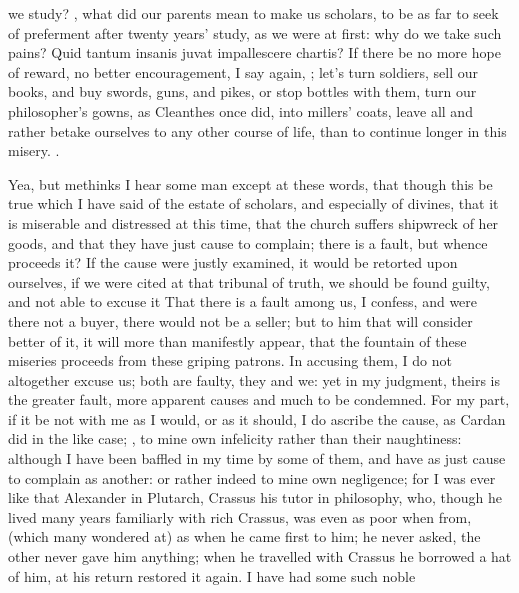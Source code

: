 {{we study? , what did
our parents mean to make us scholars, to be as far to seek of
preferment after twenty years' study, as we were at first: why do we
take such pains? Quid tantum insanis juvat impallescere chartis? If
there be no more hope of reward, no better encouragement, I say again,
; let's turn soldiers,
sell our books, and buy swords, guns, and pikes, or stop bottles with
them, turn our philosopher's gowns, as Cleanthes once did, into
millers' coats, leave all and rather betake ourselves to any other
course of life, than to continue longer in this misery. .

Yea, but methinks I hear some man except at these words, that though
this be true which I have said of the estate of scholars, and
especially of divines, that it is miserable and distressed at this
time, that the church suffers shipwreck of her goods, and that they
have just cause to complain; there is a fault, but whence proceeds it?
If the cause were justly examined, it would be retorted upon ourselves,
if we were cited at that tribunal of truth, we should be found guilty,
and not able to excuse it That there is a fault among us, I confess,
and were there not a buyer, there would not be a seller; but to him
that will consider better of it, it will more than manifestly appear,
that the fountain of these miseries proceeds from these griping
patrons. In accusing them, I do not altogether excuse us; both are
faulty, they and we: yet in my judgment, theirs is the greater fault,
more apparent causes and much to be condemned. For my part, if it be
not with me as I would, or as it should, I do ascribe the cause, as
Cardan did in the like case; , to mine own infelicity rather than their naughtiness:
although I have been baffled in my time by some of them, and have as
just cause to complain as another: or rather indeed to mine own
negligence; for I was ever like that Alexander in Plutarch,
Crassus his tutor in philosophy, who, though he lived many years
familiarly with rich Crassus, was even as poor when from, (which many
wondered at) as when he came first to him; he never asked, the other
never gave him anything; when he travelled with Crassus he borrowed a
hat of him, at his return restored it again. I have had some such noble
}}
